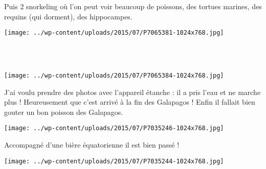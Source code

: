 Puis 2 snorkeling où l'on peut voir beaucoup de poissons, des tortues marines, des requins (qui dorment), des hippocampes. 
\begin{center} \texttt{[image: ../wp-content/uploads/2015/07/P7065381-1024x768.jpg]} \end{center}
~\\

~
\vspace{2mm}
\begin{center} \texttt{[image: ../wp-content/uploads/2015/07/P7065384-1024x768.jpg]} \end{center}
\vspace{-\topsep}
\pagebreak

J'ai voulu prendre des photos avec l'appareil étanche : il a pris l'eau et ne marche plus ! Heureusement que c'est arrivé à la fin des Galapagos !
\vfill
Enfin il fallait bien gouter un bon poisson des Galapagos. 
\vfill
\begin{center} \texttt{[image: ../wp-content/uploads/2015/07/P7035246-1024x768.jpg]} \end{center}
\vfill

Accompagné d'une bière équatorienne il est bien passé ! 
\vfill
\begin{center} \texttt{[image: ../wp-content/uploads/2015/07/P7035244-1024x768.jpg]} \end{center}
\vspace{-\topsep}
\vspace{-0.75mm}
